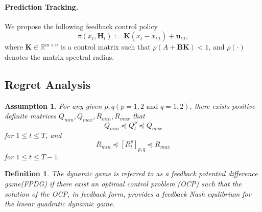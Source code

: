 \documentclass[letterpaper, 10 pt, conference]{ieeeconf}  %
\newtheorem{assumption}{Assumption}
\newtheorem{definition}{Definition}
\begin{document}
\paragraph{Prediction Tracking. } We propose the following feedback control policy
\begin{equation}
    \pi(x_{t},\mathbf{H}_{t}) := \mathbf{K}(x_{t}-x_{t|t}) + \mathbf{u}_{t|t},
\end{equation}
where $\mathbf{K}\in \mathbb{R}^{m\times n}$ is a control matrix such that $\rho(A+\mathbf{B}\mathbf{K}) < 1$, and $\rho(\cdot)$ denotes the matrix spectral radius.


\subsection{Regret Analysis}

\begin{assumption}
    For any given $p,q(p={1,2}\text{ and }q={1,2})$, there exists positive definite matrices $Q_{min}, Q_{max}, R_{min}, R_{max}$ that
    \begin{equation}
        Q_{min} \preceq Q_{t}^{p} \preceq Q_{max}
    \end{equation}
    for $1\leq t \leq T$, and
    \begin{equation}
        R_{min} \preceq [R_{t}^{p}]_{p,q} \preceq R_{max}
    \end{equation}
    for $1 \leq t \leq T-1$.
\end{assumption}

\begin{definition}
    The dynamic game is referred to as a feedback potential difference game(FPDG) if there exist an optimal control problem (OCP) such that the solution of the OCP, in feedback form, provides a feedback Nash equlibrium for the linear quadratic dynamic game. 
\end{definition}
\end{document}
